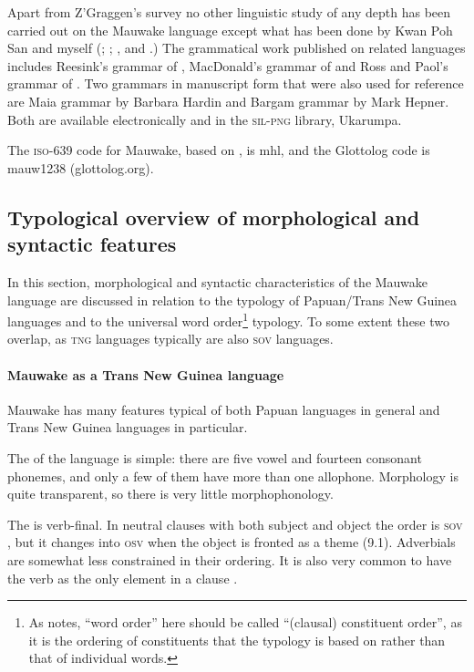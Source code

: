 Apart from Z'Graggen's survey no other linguistic study of any depth has been carried out on the Mauwake language except what has been done by Kwan Poh San and myself (\citealt{Kwan1980, Kwan1983, Kwan1988, Kwan1989, Kwan2002}; \citealt{Jarvinen1980,Jarvinen1988a,Jarvinen1988b,Jarvinen1989,Jarvinen1990,Jarvinen1991}; \citealt{JarvinenEtAl2001}, and \citealt{Berghall2006}.)  The grammatical work published on related languages includes Reesink's grammar of \citet{Usan1987}, MacDonald's grammar of \citet{Tauya1990} and Ross and Paol's grammar of \citet{Waskia1978}. Two grammars in manuscript form that were also used for reference are Maia grammar by Barbara Hardin and Bargam grammar by Mark Hepner. Both are available electronically and in the \textsc{sil-png} library, Ukarumpa.

The \textsc{iso}-639 code for Mauwake, based on \citet{Grimes2000}, is mhl, and the Glottolog code is mauw1238 (glottolog.org).

\subsection{Typological overview of morphological and syntactic features}
In this section, morphological and syntactic characteristics of the Mauwake language are discussed in relation to the typology of Papuan/Trans New Guinea languages and to the universal word order\footnote{As \citet[72]{Dixon2009} notes, ``word order'' here should be called ``(clausal) constituent order'', as it is the ordering of constituents that the typology is based on rather than that of individual words.}  typology.  To some extent these two overlap, as \textsc{tng} languages typically are also \textsc{sov} languages.

\paragraph[Mauwake as a Trans New Guinea language]{Mauwake as a Trans New Guinea language}
Mauwake has many features typical of both Papuan languages in general and Trans New Guinea languages in particular. 

The  of the language is simple: there are five vowel and fourteen consonant phonemes, and only a few of them have more than one allophone.  Morphology is quite transparent, so there is very little morphophonology.

The   is verb-final. In neutral clauses with both subject and object the order is \textsc{sov} , but it changes into \textsc{osv} when the object is fronted  as a theme (9.1).  Adverbials are somewhat less constrained in their ordering. It is also very common to have the verb as the only element in a clause . 

